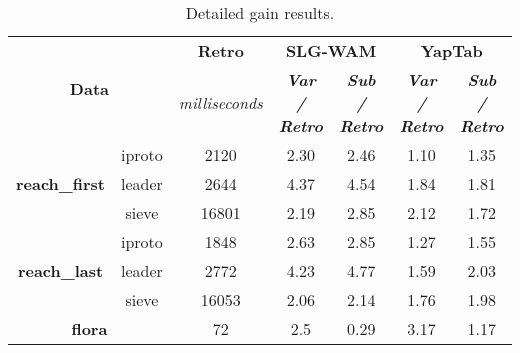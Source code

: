 \begin{table}[ht]
\centering
\footnotesize{
  \begin{tabular}{cc|c|cc|cc}
   \hline
    \hline
    \multicolumn{2}{c|}{\multirow{2}{*}{\small{\textbf{Data}}}} & \textbf{\small{Retro}} & \multicolumn{2}{c|}{\small{\textbf{SLG-WAM}}} & \multicolumn{2}{c}{\small{\textbf{YapTab}}} \\
     \multicolumn{2}{c|}{} & \scriptsize{\textit{milliseconds}} & \textbf{\textit{\scriptsize{Var / Retro}}} & \textbf{\textit{\scriptsize{Sub / Retro}}} & \textbf{\textit{\scriptsize{Var / Retro}}} & \textbf{\textit{\scriptsize{Sub / Retro}}} \\
   \hline
   \hline

\multirow{3}{*}{\textbf{reach\_first}} &  iproto &  2120 &  2.30  &  2.46  &  1.10 & 1.35 \\
&  leader &  2644 &  4.37  &  4.54  &  1.84 & 1.81 \\
&  sieve &  16801 &  2.19  &  2.85  &  2.12 & 1.72 \\
\hline
\multirow{3}{*}{\textbf{reach\_last}} &  iproto &  1848 &  2.63  &  2.85  &  1.27 & 1.55 \\
&  leader &  2772 &  4.23  &  4.77  &  1.59 & 2.03 \\
&  sieve &  16053 &  2.06  &  2.14  &  1.76 & 1.98 \\
\hline
\multicolumn{2}{c|}{\textbf{flora}} & 72 & 2.5 & 0.29 & 3.17 & 1.17 \\
\hline
\end{tabular}
}
\caption{Detailed gain results.}
\label{tbl:results_detail_gain_model}
\end{table}